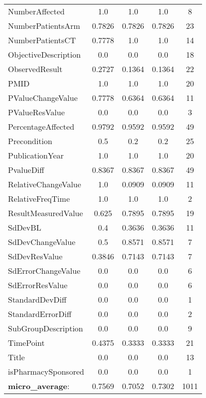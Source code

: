 \begin{longtable}{ l c c c c}
NumberAffected & 1.0 & 1.0 & 1.0 & 8\\
NumberPatientsArm & 0.7826 & 0.7826 & 0.7826 & 23\\
NumberPatientsCT & 0.7778 & 1.0 & 1.0 & 14\\
ObjectiveDescription & 0.0 & 0.0 & 0.0 & 18\\
ObservedResult & 0.2727 & 0.1364 & 0.1364 & 22\\
PMID & 1.0 & 1.0 & 1.0 & 20\\
PValueChangeValue & 0.7778 & 0.6364 & 0.6364 & 11\\
PValueResValue & 0.0 & 0.0 & 0.0 & 3\\
PercentageAffected & 0.9792 & 0.9592 & 0.9592 & 49\\
Precondition & 0.5 & 0.2 & 0.2 & 25\\
PublicationYear & 1.0 & 1.0 & 1.0 & 20\\
PvalueDiff & 0.8367 & 0.8367 & 0.8367 & 49\\
RelativeChangeValue & 1.0 & 0.0909 & 0.0909 & 11\\
RelativeFreqTime & 1.0 & 1.0 & 1.0 & 2\\
ResultMeasuredValue & 0.625 & 0.7895 & 0.7895 & 19\\
SdDevBL & 0.4 & 0.3636 & 0.3636 & 11\\
SdDevChangeValue & 0.5 & 0.8571 & 0.8571 & 7\\
SdDevResValue & 0.3846 & 0.7143 & 0.7143 & 7\\
SdErrorChangeValue & 0.0 & 0.0 & 0.0 & 6\\
SdErrorResValue & 0.0 & 0.0 & 0.0 & 6\\
StandardDevDiff & 0.0 & 0.0 & 0.0 & 1\\
StandardErrorDiff & 0.0 & 0.0 & 0.0 & 2\\
SubGroupDescription & 0.0 & 0.0 & 0.0 & 9\\
TimePoint & 0.4375 & 0.3333 & 0.3333 & 21\\
Title & 0.0 & 0.0 & 0.0 & 13\\
isPharmacySponsored & 0.0 & 0.0 & 0.0 & 1\\
\textbf{micro\_average}: & 0.7569 & 0.7052 & 0.7302 & 1011 
\label{tab:Diabetes_eventextr}
\end{longtable}

